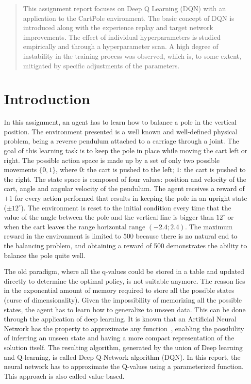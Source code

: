 \documentclass{article}
\begin{document}
\begin{abstract}
This assignment report focuses on Deep Q Learning (DQN)
with an application to the CartPole environment. 
The basic concept of DQN is introduced along with the experience replay 
and target network improvements.
The effect of individual hyperparameters is studied empirically 
and through a hyperparameter scan.
A high degree of instability in the training process was observed, 
which is, to some extent, mitigated by specific adjustments of the parameters.
\end{abstract}

\section{Introduction}
\label{sec:introduction}
In this assignment, an agent has to learn how to balance a pole in the vertical position.
The environment presented is a well known and well-defined physical problem, being a reverse pendulum attached to a carriage through a joint.
The goal of this learning task is to keep the pole in place while moving the cart left or right.
The possible action space is made up by a set of only two possible movements $\{0,1\}$, where $0$: the cart is pushed to the left; $1$: the cart is pushed to the right.
The state space is composed of four values: position and velocity of the cart, angle and angular velocity of the pendulum.
The agent receives a reward of $+1$ for every action performed that results in keeping the pole in an upright state ($\pm 12^\circ$).
The environment is reset to the initial condition every time that the value of the angle between the pole and the vertical line is bigger than $12^\circ$ or when the cart leaves the range horizontal range $(-2.4;2.4)$.
The maximum reward in the environment is limited to 500 because there is no natural end to the balancing problem, and obtaining a reward of 500 demonstrates the ability to balance the pole quite well.

The old paradigm, where all the q-values could be stored in a table and updated directly to determine the optimal policy, is not suitable anymore.
The reason lies in the exponential amount of memory required to store all the possible states (curse of dimensionality).
Given the impossibility of memorizing all the possible states, the agent has to learn how to generalize to unseen data.
This can be done through the application of deep learning.
It is known that an Artificial Neural Network has the property to approximate any function~\cite{Cybenko}, enabling the possibility of inferring an unseen state and having a more compact representation of the solution itself.
The resulting algorithm, generated by the union of Deep learning and Q-learning, is called Deep Q-Network algorithm (DQN).
In this report, the neural network has to approximate the Q-values using a parameterized function.
This approach is also called value-based.
\end{document}
